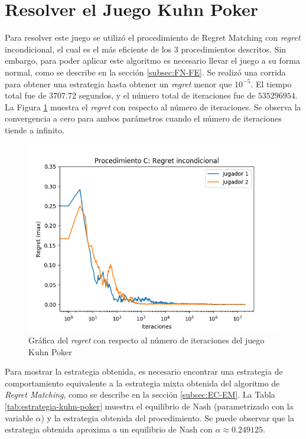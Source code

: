\section{Resolver el Juego Kuhn Poker}

Para resolver este juego se utilizó el procedimiento de Regret Matching con \textit{regret} incondicional, el cual es el más eficiente de los $3$ procedimientos descritos. Sin embargo, para poder aplicar este algoritmo es necesario llevar el juego a su forma normal, como se describe en la sección \ref{subsec:FN-FE}. Se realizó una corrida para obtener una estrategia hasta obtener un \textit{regret} menor que $10^{-5}$. El tiempo total fue de $3707.72$ segundos, y el número total de iteraciones fue de $535296954$. La Figura \ref{fig:regret-kuhn-poker} muestra el \textit{regret} con respecto al número de iteraciones. Se observa la convergencia a cero para ambos parámetros cuando el número de iteraciones tiende a infinito.

\begin{figure}[ht]
\caption{Gráfica del \textit{regret} con respecto al número de iteraciones del juego Kuhn Poker}
\label{fig:regret-kuhn-poker}
\centering
\includegraphics[width=1\textwidth]{graficas/kuhn/procedimiento-C.png}
\end{figure}

Para mostrar la estrategia obtenida, es necesario encontrar una estrategia de comportamiento equivalente a la estrategia mixta obtenida del algoritmo de \textit{Regret Matching}, como se describe en la sección \ref{subsec:EC-EM}. La Tabla \ref{tab:estrategia-kuhn-poker} muestra el equilibrio de Nash (parametrizado con la variable $\alpha$) y la estrategia obtenida del procedimiento. Se puede observar que la estrategia obtenida aproxima a un equilibrio de Nash con $\alpha \approx 0.249125$.

